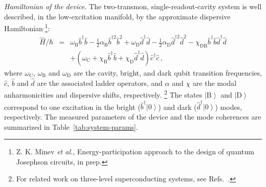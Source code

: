 \documentclass[
						superscriptaddress, 																 amsmath, amssymb,
		 aps,  prb,  
										floatfix,
		linenumbers,
			]{revtex4-1}
\newcommand{\ket}[1]{\left|#1\right>}
\begin{document}
\textit{Hamiltonian of the device.}
The two-transmon, single-readout-cavity system is well described, in the low-excitation manifold, by the approximate dispersive Hamiltonian\cite{Nigg2012}${}^{,}$\footnote{Z. K. Minev \textit{et al.}, Energy-participation approach to the design of quantum Josephson circuits, in prep.}: \begin{eqnarray}
\hat{H}/\hbar&=& \omega_{\mathrm{B}}\hat{b}^{\dagger}\hat{b}-\frac{1}{2}\alpha_{\mathrm{B}}\hat{b}^{\dagger2}\hat{b}^{2}+\omega_{\mathrm{D}}\hat{d}^{\dagger}\hat{d}-\frac{1}{2}\alpha_{\mathrm{D}}\hat{d}^{\dagger2}\hat{d}^{2}-\chi_{\mathrm{DB}}\hat{b}^{\dagger}\hat{b}\hat{d}^{\dagger}\hat{d}\label{eq:Hamiltonian-of-sys}\\
 &&+\left(\omega_{\mathrm{C}}+\chi_{\mathrm{B}}\hat{b}^{\dagger}\hat{b}+\chi_{\mathrm{D}}\hat{d}^{\dagger}\hat{d}\right)\hat{c}^{\dagger}\hat{c}\,,\nonumber
\end{eqnarray}
where $\omega_{\mathrm{C}}$, $\omega_{\mathrm{B}}$ and $\omega_{\mathrm{D}}$
are the cavity, bright, and dark qubit transition frequencies, $\hat{c}$,
$\hat{b}$ and $\hat{d}$ are the associated ladder operators, and
$\alpha$ and $\chi$ are the modal anharmonicities and dispersive
shifts, respectively. \footnote{
For related work on  three-level superconducting systems, see Refs.~.}
The states $\ket{\mathrm{B}}$ and $\ket{\mathrm{D}}$
correspond to one excitation in the bright ($\hat{b}^{\dagger}\ket 0$)
and dark ($\hat{d}^{\dagger}\ket 0$) modes, respectively.
The measured parameters of the device and the mode coherences are summarized in Table~\ref{tab:system-params}.
\end{document}

